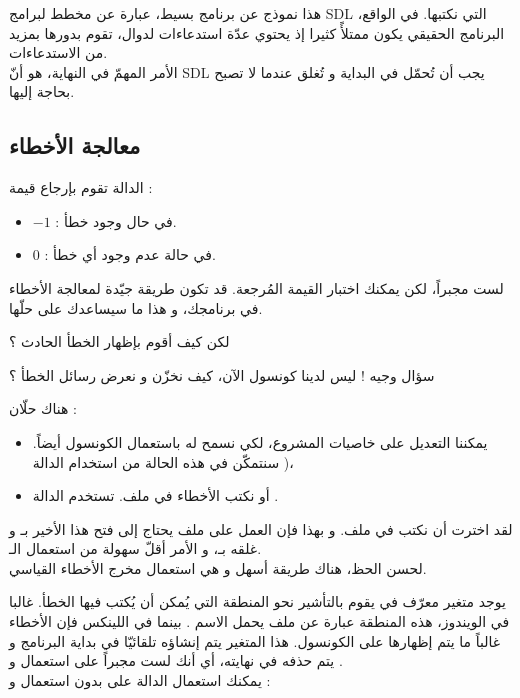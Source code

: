 هذا نموذج عن برنامج بسيط، عبارة عن مخطط لبرامج
\textenglish{SDL}
التي نكتبها. في الواقع، البرنامج الحقيقي يكون ممتلأً كثيرا إذ يحتوي عدّة استدعاءات لدوال، تقوم بدورها بمزيد من الاستدعاءات.\\
الأمر المهمّ في النهاية، هو أنّ
\textenglish{SDL}
يجب أن تُحمّل في البداية و تُغلق عندما لا تصبح بحاجة إليها.

\subsection{معالجة الأخطاء}

الدالة 
تقوم بإرجاع قيمة :

\begin{itemize}
	\item $ -1 $ : في حال وجود خطأ.
	\item $ 0 $ : في حالة عدم وجود أي خطأ.
\end{itemize}

لست مجبراً، لكن يمكنك اختبار القيمة المُرجعة. قد تكون طريقة جيّدة لمعالجة الأخطاء في برنامجك، و هذا ما سيساعدك على حلّها.

\begin{question}
لكن كيف أقوم بإظهار الخطأ الحادث ؟
\end{question}

سؤال وجيه ! ليس لدينا كونسول الآن، كيف نخزّن و نعرض رسائل الخطأ ؟

هناك حلّان :
\begin{itemize}
	\item يمكننا التعديل على خاصيات المشروع، لكي نسمح له باستعمال الكونسول أيضاً. سنتمكّن في هذه الحالة من استخدام الدالة 
	)،
	\item أو نكتب الأخطاء في ملف. تستخدم الدالة
	.
\end{itemize}

لقد اخترت أن نكتب في ملف. و بهذا فإن العمل على ملف يحتاج إلى فتح هذا الأخير بـ
و غلقه بـ،
و الأمر أقلّ سهولة من استعمال الـ.\\
لحسن الحظ، هناك طريقة أسهل و هي استعمال مخرج الأخطاء القياسي.

يوجد متغير 
معرّف في 
يقوم بالتأشير نحو المنطقة التي يُمكن أن يُكتب فيها الخطأ. غالبا في الويندوز، هذه المنطقة عبارة عن ملف يحمل الاسم 
.
بينما في اللينكس فإن الأخطاء غالباً ما يتم إظهارها على الكونسول. هذا المتغير يتم إنشاؤه تلقائيّا في بداية البرنامج و يتم حذفه في نهايته، أي أنك لست مجبراً على استعمال 
و
.\\
يمكنك استعمال الدالة
على 
بدون استعمال  
و 
 :

